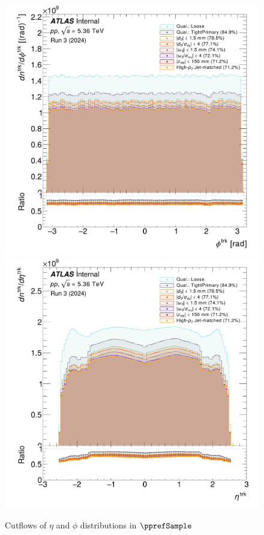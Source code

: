 
\begin{figure}[h]
    \centering
    \includegraphics[width=0.49\linewidth]{images/trk_phi_cutflow_.png}
    \includegraphics[width=0.49\linewidth]{images/trk_eta_cutflow_.png}
    \caption{Cutflows of $\eta$ and $\phi$ distributions in $\pprefSample$}
    \label{fig:cutflow_eta_phi}
\end{figure}

